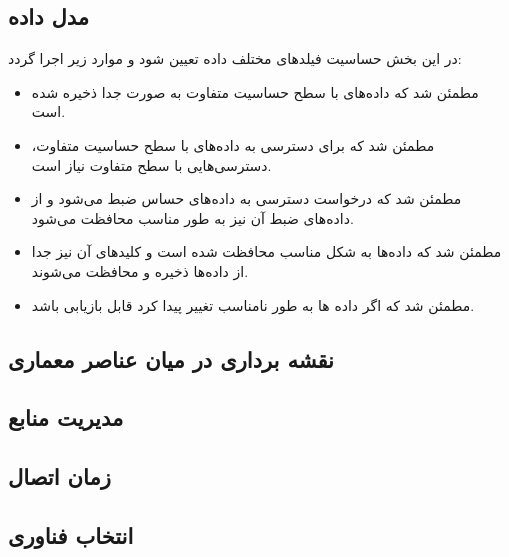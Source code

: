 \subsection{مدل داده}
در این بخش حساسیت فیلد‌های مختلف داده تعیین شود و موارد زیر اجرا گردد:
\begin{itemize}
\item
مطمئن شد که داده‌های با سطح حساسیت متفاوت به صورت جدا ذخیره شده است.
\item
مطمئن شد که برای دسترسی به داده‌های با سطح حساسیت متفاوت، دسترسی‌هایی با سطح متفاوت نیاز است.
\item
مطمئن شد که درخواست دسترسی به داده‌های حساس ضبط می‌شود و از داده‌های ضبط آن نیز به طور مناسب محافظت می‌شود.
\item 
مطمئن شد که داده‌ها به شکل مناسب محافظت شده است و کلید‌های آن نیز جدا از داده‌ها  ذخیره و محافظت می‌شوند.
\item
مطمئن شد که اگر داده ‌ها به طور نامناسب تغییر پیدا کرد قابل بازیابی باشد.
\end{itemize}

\subsection{نقشه برداری در میان عناصر معماری}
\subsection{مدیریت منابع}
\subsection{زمان اتصال}
\subsection{انتخاب فناوری}
